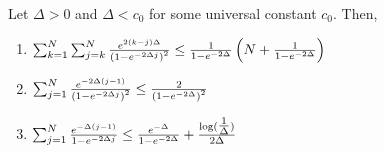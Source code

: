 \begin{lemma}\label{lemma:sum_bound_1}
Let $\Delta > 0$ and $\Delta < c_0$ for some universal constant $c_0$. Then, \begin{enumerate}
    \item $\sum_{k =1}^{N}\sum_{j = k}^{N}\frac{e^{2\left(k-j\right)\Delta}}{\left(1-e^{-2\Delta j}\right)^{2}} \leq \frac{1}{1 - e^{-2\Delta}}\left(N + \frac{1}{1-e^{-2\Delta}}\right)$
    \item $\sum_{j=1}^{N}\frac{e^{-2\Delta\left(j-1\right)}}{\left(1-e^{-2\Delta j}\right)^{2}} \leq \frac{2}{\left(1-e^{-2\Delta }\right)^{2}}$
    \item     
    $\sum_{j=1}^{N}\frac{e^{-\Delta\left(j-1\right)}}{1-e^{-2\Delta j}} \leq \frac{e^{-\Delta }}{1-e^{-2\Delta }} + \frac{\log(\tfrac{1}{\Delta})}{2\Delta}$
\end{enumerate}
\end{lemma}
